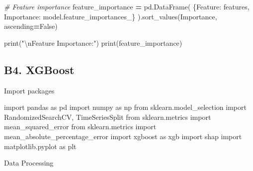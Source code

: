 \documentclass[mstat,12pt]{unswthesis}
\newenvironment{Shaded}{\begin{snugshade}}{\end{snugshade}}
\newcommand{\BuiltInTok}[1]{#1}
\newcommand{\CharTok}[1]{\textcolor[rgb]{0.31,0.60,0.02}{#1}}
\newcommand{\CommentTok}[1]{\textcolor[rgb]{0.56,0.35,0.01}{\textit{#1}}}
\newcommand{\ImportTok}[1]{#1}
\newcommand{\NormalTok}[1]{#1}
\newcommand{\OperatorTok}[1]{\textcolor[rgb]{0.81,0.36,0.00}{\textbf{#1}}}
\newcommand{\StringTok}[1]{\textcolor[rgb]{0.31,0.60,0.02}{#1}}
\newcommand{\VariableTok}[1]{\textcolor[rgb]{0.00,0.00,0.00}{#1}}
\begin{document}
\begin{Shaded}
\begin{Highlighting}[]
\CommentTok{\# Feature importance}
\NormalTok{feature\_importance }\OperatorTok{=}\NormalTok{ pd.DataFrame(}
\NormalTok{    \{}\StringTok{\textquotesingle{}Feature\textquotesingle{}}\NormalTok{: features,}
     \StringTok{\textquotesingle{}Importance\textquotesingle{}}\NormalTok{: model.feature\_importances\_\}}
\NormalTok{).sort\_values(}\StringTok{\textquotesingle{}Importance\textquotesingle{}}\NormalTok{, ascending}\OperatorTok{=}\VariableTok{False}\NormalTok{)}

\BuiltInTok{print}\NormalTok{(}\StringTok{"}\CharTok{\textbackslash{}n}\StringTok{Feature Importance:"}\NormalTok{)}
\BuiltInTok{print}\NormalTok{(feature\_importance)}
\end{Highlighting}
\end{Shaded}

\subsection*{B4. XGBoost}\label{b4.-xgboost}

Import packages

\begin{Shaded}
\begin{Highlighting}[]
\ImportTok{import}\NormalTok{ pandas }\ImportTok{as}\NormalTok{ pd}
\ImportTok{import}\NormalTok{ numpy }\ImportTok{as}\NormalTok{ np}
\ImportTok{from}\NormalTok{ sklearn.model\_selection }\ImportTok{import}\NormalTok{ RandomizedSearchCV, TimeSeriesSplit}
\ImportTok{from}\NormalTok{ sklearn.metrics }\ImportTok{import}\NormalTok{ mean\_squared\_error}
\ImportTok{from}\NormalTok{ sklearn.metrics }\ImportTok{import}\NormalTok{ mean\_absolute\_percentage\_error}
\ImportTok{import}\NormalTok{ xgboost }\ImportTok{as}\NormalTok{ xgb}
\ImportTok{import}\NormalTok{ shap}
\ImportTok{import}\NormalTok{ matplotlib.pyplot }\ImportTok{as}\NormalTok{ plt}
\end{Highlighting}
\end{Shaded}

\noindent Data Processing
\end{document}
